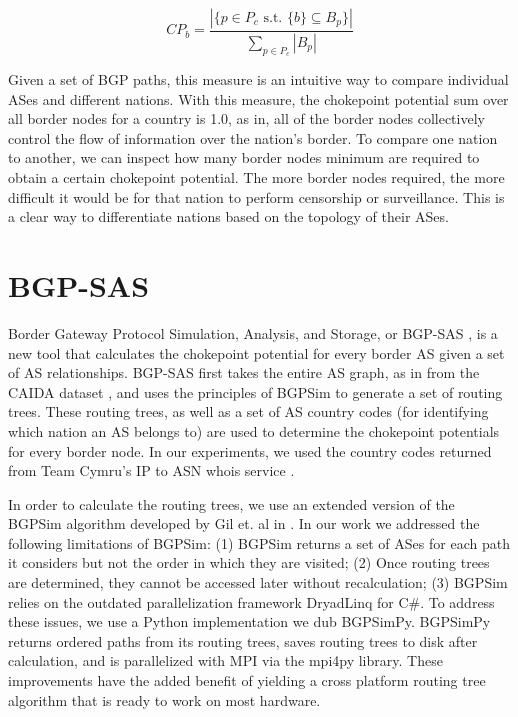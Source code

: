 \documentclass[10pt, conference, letterpaper]{IEEEtran}
\newcommand{\toolname}{BGP-SAS }
\begin{document}
\begin{equation}\label{eqn:chokePointPotential}
CP_b = \frac{|\{p \in P_c \textrm{ s.t. } \{b\} \subseteq B_p\}|}{\sum_{p \in P_c}|B_p|}
\end{equation}

\par
Given a set of BGP paths, this measure is an intuitive way to compare individual ASes and different nations. With this measure,
the chokepoint potential sum over all border nodes for a country is 1.0, as in, all of the border nodes collectively control the
flow of information over the nation's border. To compare one nation to another, we can inspect how many border nodes minimum are required
to obtain a certain chokepoint potential. The more border nodes required, the more difficult it would be for that nation to perform
censorship or surveillance. This is a clear way to differentiate nations based on the topology of their ASes.

\section{\toolname}

Border Gateway Protocol Simulation, Analysis, and Storage, or \toolname, is a new tool that calculates the chokepoint potential for every border AS given a set of AS relationships.
\toolname first takes the entire AS graph, as in from the CAIDA dataset \cite{CAIDA}, and uses the principles of BGPSim \cite{quicksand}
to generate a set of routing trees. These routing trees, as well as a set of AS country codes (for identifying which nation an AS belongs to)
are used to determine the chokepoint potentials for every border node. In our experiments, we used the country codes returned from Team Cymru's
IP to ASN whois service \cite{cymru}.

\par
In order to calculate the routing trees, we use an extended version of the BGPSim algorithm developed by Gil et. al in \cite{quicksand}. In
our work we addressed the following limitations of BGPSim: (1) BGPSim returns a set of ASes for each path it considers but not the order in which
they are visited; (2) Once routing trees are determined, they cannot be accessed later without recalculation; (3) BGPSim relies on the outdated parallelization
framework DryadLinq for C\#. To address these issues, we use a Python implementation we dub BGPSimPy. BGPSimPy returns ordered paths from its routing trees,
saves routing trees to disk after calculation, and is parallelized with MPI via the mpi4py library. These improvements have the added benefit of yielding a cross platform
routing tree algorithm that is ready to work on most hardware.
\end{document}

